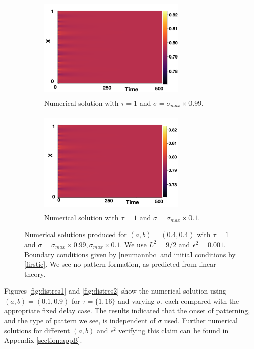 \begin{figure}[H]
    \centering
    \begin{subfigure}[t]{0.45\textwidth}
        \centering
        \includegraphics[width=7cm,height=5cm]{distp2sig1.png}
        \caption{Numerical solution with $\tau=1$ and $\sigma=\sigma_{max}\times0.99$.}
        \label{}
    \end{subfigure}
    \hfill
    \begin{subfigure}[t]{0.45\textwidth}
        \centering
        \includegraphics[width=7cm,height=5cm]{distp2sig2.png}
        \caption{Numerical solution with $\tau=1$ and $\sigma=\sigma_{max}\times0.1$.}
        \label{}
    \end{subfigure}
    \caption{Numerical solutions produced for $(a,b)=(0.4,0.4)$ with $\tau=1$ and $\sigma=\sigma_{max}\times0.99, \sigma_{max}\times0.1$. We use $L^2=9/2$ and $\epsilon^2=0.001$. Boundary conditions given by \eqref{neumannbc} and initial conditions by \eqref{firstic}. We see no pattern formation, as predicted from linear theory.}
    \label{fig:testdist2}
\end{figure}
Figures \ref{fig:distres1} and \ref{fig:distres2} show the numerical solution using $(a,b)=(0.1,0.9)$ for $\tau=\{1,16\}$ and varying $\sigma$, each compared with the appropriate fixed delay case. The results indicated that the onset of patterning, and the type of pattern we see, is independent of $\sigma$ used. Further numerical solutions for different $(a,b)$ and $\epsilon^2$ verifying this claim can be found in Appendix \ref{section:appB}.

